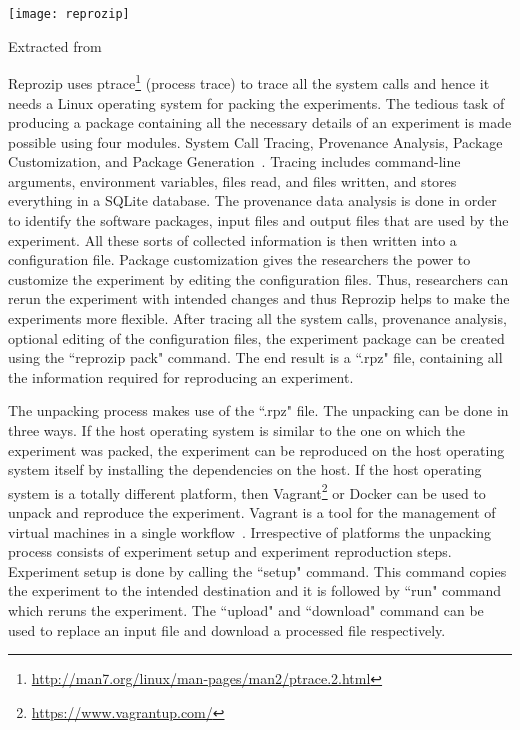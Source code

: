 \begin{center}
\texttt{[image: reprozip]}
\label{fig:Reprozip_packing_and_unpacking}
\caption*{Extracted from \cite{Rampin2016}}
\end{center}

Reprozip uses ptrace\footnote{\url{http://man7.org/linux/man-pages/man2/ptrace.2.html}} (process trace) to trace all the system calls and hence it needs a Linux operating system for packing the experiments. The tedious task of producing a package containing all the necessary details of an experiment is made possible using four modules. System Call Tracing, Provenance Analysis, Package Customization, and Package Generation~\cite{Chirigati:2013:RUP:2482613.2482614}. Tracing includes command-line arguments, environment variables, files read, and files written, and stores everything in a SQLite database. The provenance data analysis is done in order to identify the software packages, input files and output files that are used by the experiment. All these sorts of collected information is then written into a configuration file. Package customization gives the researchers the power to customize the experiment by editing the configuration files. Thus, researchers can rerun the experiment with intended changes and thus Reprozip helps to make the experiments more flexible. After tracing all the system calls, provenance analysis, optional editing of the configuration files, the experiment package can be created using the ``reprozip pack" command. The end result is a ``.rpz" file, containing all the information required for reproducing an experiment.

The unpacking process makes use of the ``.rpz" file. The unpacking can be done in three ways. If the host operating system is similar to the one on which the experiment was packed, the experiment can be reproduced on the host operating system itself by installing the dependencies on the host. If the host operating system is a totally different platform, then Vagrant\footnote{\url{https://www.vagrantup.com/}} or Docker can be used to unpack and reproduce the experiment. Vagrant is a tool for the management of virtual machines in a single workflow~\cite{vagrant}. Irrespective of platforms the unpacking process consists of experiment setup and experiment reproduction steps. Experiment setup is done by calling the ``setup" command. This command copies the experiment to the intended destination and it is followed by ``run" command which reruns the experiment. The ``upload" and ``download" command can be used to replace an input file and download a processed file respectively.

